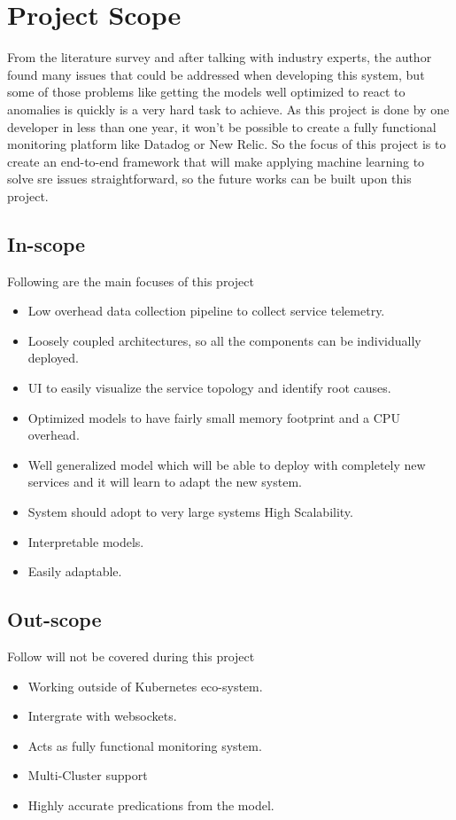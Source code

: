 \section{Project Scope}

From the literature survey and after talking with industry experts, the author found many issues that could be addressed when developing this system, but some of those problems like getting the models well optimized to react to anomalies is quickly is a very hard task to achieve. As this project is done by one developer in less than one year, it won't be possible to create a fully functional monitoring platform like Datadog or New Relic. So the focus of this project is to create an end-to-end framework that will make applying machine learning to solve \ac{sre} issues straightforward, so the future works can be built upon this project.

\subsection{In-scope} \label{sec:in-scope}
Following are the main focuses of this project
\begin{itemize}[noitemsep,nolistsep] 
    \item Low overhead data collection pipeline to collect service telemetry.
    \item Loosely coupled architectures, so all the components can be individually deployed.
    \item UI to easily visualize the service topology and identify root causes.
    \item Optimized models to have fairly small memory footprint and a CPU overhead.
    \item Well generalized model which will be able to deploy with completely new services and it will learn to adapt the new system.
    \item System should adopt to very large systems High Scalability.
    \item Interpretable models.
    \item Easily adaptable.
\end{itemize}


\subsection{Out-scope} \label{sec:out-scope}
Follow will not be covered during this project
\begin{itemize}[noitemsep,nolistsep]
    \item Working outside of Kubernetes eco-system.
    \item Intergrate with websockets.
    \item Acts as fully functional monitoring system.
    \item Multi-Cluster support
    \item Highly accurate predications from the model.
\end{itemize}

